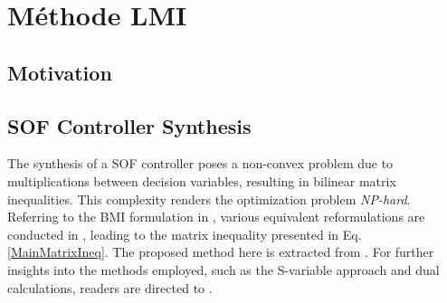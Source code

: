 \chapter{Méthode LMI }
\minitoc
\label{chap:LMI}



\section{Motivation}
\label{sec:motivationLMI}

\section{SOF Controller Synthesis}
\label{SOF Controller Synthesis}

The synthesis of a SOF controller poses a non-convex problem due to multiplications between decision variables, resulting in bilinear matrix inequalities. This complexity renders the optimization problem \textit{NP-hard}. Referring to the BMI formulation in \cite{ebihara:hal-01760625}, various equivalent reformulations are conducted in \cite{Arzelier2018}, leading to the matrix inequality presented in Eq. \ref{MainMatrixIneq}. The proposed method here is extracted from \cite{ebihara:hal-01760625}. For further insights into the methods employed, such as the S-variable approach and dual calculations, readers are directed to \cite{ebihara:hal-01760625}.

